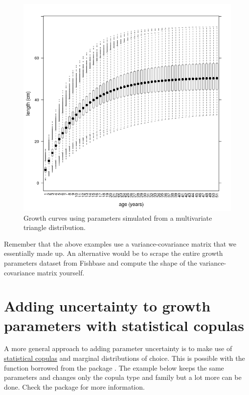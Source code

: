\documentclass[a4paper,english,10pt]{article}\usepackage[]{graphicx}\usepackage[]{color}
\newenvironment{knitrout}{}{} %
\begin{document}
\begin{knitrout}
\color{fgcolor}\begin{figure}[H]

{\centering \includegraphics[width=.9\linewidth]{figure/plot_tri_growth-1} 

}

\caption[Growth curves using parameters simulated from a multivariate triangle distribution]{Growth curves using parameters simulated from a multivariate triangle distribution.}\label{fig:plot_tri_growth}
\end{figure}


\end{knitrout}

Remember that the above examples use a variance-covariance matrix that we essentially made up. An alternative would be to scrape the entire growth parameters dataset from Fishbase and compute the shape of the variance-covariance matrix yourself.

\section{Adding uncertainty to growth parameters with statistical copulas}

A more general approach to adding parameter uncertainty is to make use of \href{http://www.encyclopediaofmath.org/index.php/Copula}{statistical copulas} and marginal distributions of choice. This is possible with the  function borrowed from the package \href{http://cran.r-project.org/web/packages/copula/}{}. The example below keeps the same parameters and changes only the copula type and family but a lot more can be done. Check the package  for more information. 
\end{document}
